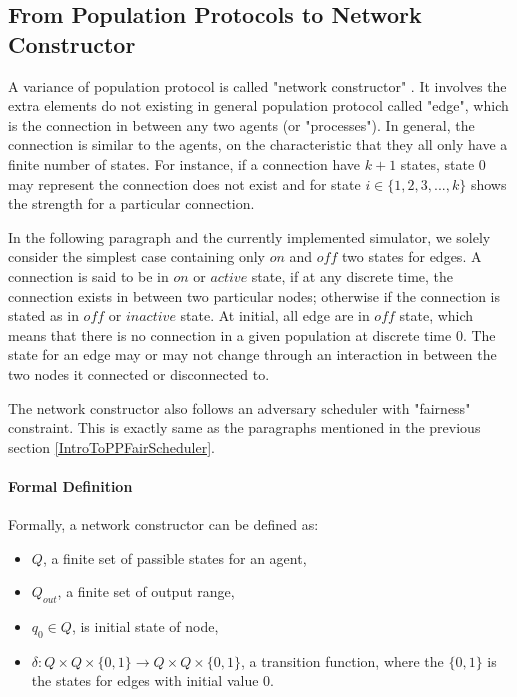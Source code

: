 \subsection{From Population Protocols to Network Constructor \cite{MS16a}}

\par\noindent
A variance of population protocol is called "network constructor" \cite{MS16a}.
It involves the extra elements do not existing in general population protocol called "edge", which is
the connection in between any two agents (or "processes"). In general, the connection
is similar to the agents, on the characteristic that they all only have a finite number of states. For instance, if
a connection have $k + 1$ states,  state 0 may represent the connection does not exist and for state $i \in \{1,2,3, ..., k\}$
shows the strength for a particular connection.


\par\noindent
In the following paragraph and the currently implemented simulator, we solely consider the simplest
case containing only $on$ and $off$ two states for edges. A connection is said to be in
$on$ or $active$ state, if at any discrete time, the connection exists in between two
particular nodes; otherwise if the connection is stated as in $off$ or $inactive$ state.
At initial, all edge are in $off$ state, which means that there is no connection in a given
population at discrete time 0. The state for an edge may or may not change through an interaction
in between the two nodes it connected or disconnected to.


\par\noindent
The network constructor also follows an adversary scheduler with "fairness" constraint. This is
exactly same as the paragraphs mentioned in the previous section \ref{IntroToPPFairScheduler}.

\paragraph{Formal Definition}
Formally, a network constructor can be defined as:
\begin{itemize}
  \item $Q$, a finite set of passible states for an agent,
  \item $Q_{out}$, a finite set of output range,
  \item $q_{0} \in Q $, is initial state of node,
  \item $\delta: Q \times Q \times \{0,1\} \to Q \times Q \times \{0,1\}$, a transition function, where the $\{0,1\}$ is the states for edges with initial value 0.
\end{itemize}


